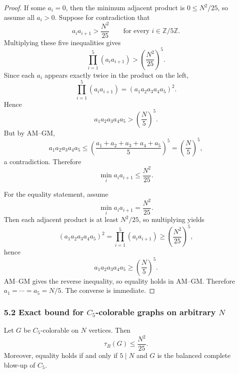 \begin{proof}
If some $a_i=0$, then the minimum adjacent product is $0\le N^2/25$, so assume all $a_i>0$.
Suppose for contradiction that
\[
a_i a_{i+1}>\frac{N^2}{25}
\qquad\text{for every }i\in\mathbb Z/5\mathbb Z.
\]
Multiplying these five inequalities gives
\[
\prod_{i=1}^5 (a_i a_{i+1})>\left(\frac{N^2}{25}\right)^5.
\]
Since each $a_i$ appears exactly twice in the product on the left,
\[
\prod_{i=1}^5 (a_i a_{i+1})=(a_1a_2a_3a_4a_5)^2.
\]
Hence
\[
a_1a_2a_3a_4a_5>\left(\frac{N}{5}\right)^5.
\]
But by AM--GM,
\[
a_1a_2a_3a_4a_5\le \left(\frac{a_1+a_2+a_3+a_4+a_5}{5}\right)^5=\left(\frac{N}{5}\right)^5,
\]
a contradiction.  Therefore
\[
\min_i a_i a_{i+1}\le \frac{N^2}{25}.
\]

For the equality statement, assume
\[
\min_i a_i a_{i+1}=\frac{N^2}{25}.
\]
Then each adjacent product is at least $N^2/25$, so multiplying yields
\[
(a_1a_2a_3a_4a_5)^2=\prod_{i=1}^5 (a_i a_{i+1})\ge \left(\frac{N^2}{25}\right)^5,
\]
hence
\[
a_1a_2a_3a_4a_5\ge \left(\frac{N}{5}\right)^5.
\]
AM--GM gives the reverse inequality, so equality holds in AM--GM.
Therefore $a_1=\cdots=a_5=N/5$.
The converse is immediate.
\end{proof}

\subsubsection*{5.2 Exact bound for $C_5$-colorable graphs on arbitrary $N$}
\begin{theorem}\label{thm:C5colorable_generalN}
Let $G$ be $C_5$-colorable on $N$ vertices. Then
\[
\tau_B(G)\le \frac{N^2}{25}.
\]
Moreover, equality holds if and only if $5\mid N$ and $G$ is the balanced complete blow-up of $C_5$.
\end{theorem}


